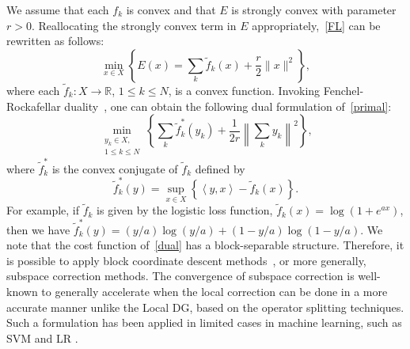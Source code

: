\begin{itemize}
We assume that each $f_k$ is convex and that $E$ is strongly convex with parameter $r > 0$. Reallocating the strongly convex term in $E$ appropriately,~\cref{FL} can be rewritten as follows:
\begin{equation}\label{primal}
\min_{x \in X} \left\{ E(x) = \sum_k \tilde{f}_k (x) + \frac{r}{2} \|x\|^2 \right\},
\end{equation}
where each $\tilde{f}_k \colon X \rightarrow \mathbb{R}$, $1 \leq k \leq N$, is a convex function. Invoking Fenchel-Rockafellar duality~\cite{CP:2016}, one can obtain the following dual formulation of~\cref{primal}:
\begin{equation}\label{dual}
\min_{\substack{y_k \in X, \\ 1\leq k\leq N}} \left\{ \sum_k \tilde{f}_k^* (y_k) + \frac{1}{2r} \left\| \sum_k y_k \right\|^2 \right\},
\end{equation}
where $\tilde{f}_k^*$ is the convex conjugate of $\tilde{f}_k$ defined by
\begin{equation*}
    \tilde{f}_k^* (y) = \sup_{x \in X} \left\{ \left< y, x \right> - \tilde{f}_k (x) \right\}.
\end{equation*}
For example, if $\tilde{f}_k$ is given by the logistic loss function, $\tilde{f}_k (x) = \log (1 + e^{ax})$, then we have $\tilde{f}_k^* (y) = (y/a) \log (y/a) + (1 - y/a) \log (1 - y/a)$. We note that the cost function of~\cref{dual} has a block-separable structure. Therefore, it is possible to apply block coordinate descent methods~\cite{CP:2015}, or more generally, subspace correction methods. The convergence of subspace correction is well-known to generally accelerate when the local correction can be done in a more accurate manner unlike the Local DG, based on the operator splitting techniques. Such a formulation has been applied in limited cases in machine learning, such as SVM \cite{hsieh2008dual} and LR \cite{yu2011dual}. 


\end{itemize}
